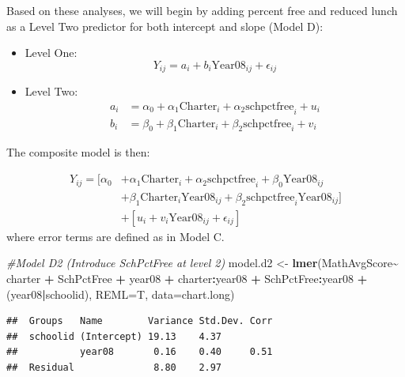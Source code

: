 \documentclass[
]{krantz}
\newenvironment{Shaded}{\begin{snugshade}}{\end{snugshade}}
\newcommand{\AttributeTok}[1]{\textcolor[rgb]{0.27,0.27,0.27}{#1}}
\newcommand{\CommentTok}[1]{\textcolor[rgb]{0.37,0.37,0.37}{\textit{#1}}}
\newcommand{\FunctionTok}[1]{\textcolor[rgb]{0.27,0.27,0.27}{\textbf{#1}}}
\newcommand{\NormalTok}[1]{#1}
\newcommand{\OtherTok}[1]{\textcolor[rgb]{0.37,0.37,0.37}{#1}}
\newcommand{\SpecialCharTok}[1]{\textcolor[rgb]{0.43,0.43,0.43}{\textbf{#1}}}
\begin{document}
Based on these analyses, we will begin by adding percent free and reduced lunch as a Level Two predictor for both intercept and slope (Model D):

\begin{itemize}
\item
  Level One:
  \begin{equation*}
  Y_{ij}=a_{i} + b_{i}\textrm{Year08}_{ij} + \epsilon_{ij}
  \end{equation*}
\item
  Level Two:
  \begin{align*}
  a_{i} & = \alpha_{0} + \alpha_{1}\textrm{Charter}_i + \alpha_{2}\textrm{schpctfree}_i + u_{i}\\
  b_{i} & = \beta_{0} + \beta_{1}\textrm{Charter}_i + \beta_{2}\textrm{schpctfree}_i + v_{i}
  \end{align*}
\end{itemize}

The composite model is then:

\begin{align*}
Y_{ij}= [\alpha_{0}&+\alpha_{1}\textrm{Charter}_i +\alpha_{2}\textrm{schpctfree}_i + \beta_{0}\textrm{Year08}_{ij} \nonumber \\
 &+ \beta_{1}\textrm{Charter}_i\textrm{Year08}_{ij}  + \beta_{2}\textrm{schpctfree}_i\textrm{Year08}_{ij}] \nonumber \\ 
 &+ [u_{i} + v_{i}\textrm{Year08}_{ij} + \epsilon_{ij}]
\end{align*}
where error terms are defined as in Model C.

\begin{Shaded}
\begin{Highlighting}[]
\CommentTok{\#Model D2 (Introduce SchPctFree at level 2)}
\NormalTok{model.d2 }\OtherTok{\textless{}{-}} \FunctionTok{lmer}\NormalTok{(MathAvgScore}\SpecialCharTok{\textasciitilde{}}\NormalTok{ charter }\SpecialCharTok{+}\NormalTok{ SchPctFree }\SpecialCharTok{+}\NormalTok{ year08 }\SpecialCharTok{+} 
\NormalTok{  charter}\SpecialCharTok{:}\NormalTok{year08 }\SpecialCharTok{+}\NormalTok{ SchPctFree}\SpecialCharTok{:}\NormalTok{year08 }\SpecialCharTok{+}\NormalTok{ (year08}\SpecialCharTok{|}\NormalTok{schoolid),}
  \AttributeTok{REML=}\NormalTok{T, }\AttributeTok{data=}\NormalTok{chart.long)}
\end{Highlighting}
\end{Shaded}

\begin{verbatim}
##  Groups   Name        Variance Std.Dev. Corr
##  schoolid (Intercept) 19.13    4.37         
##           year08       0.16    0.40     0.51
##  Residual              8.80    2.97
\end{verbatim}
\end{document}

